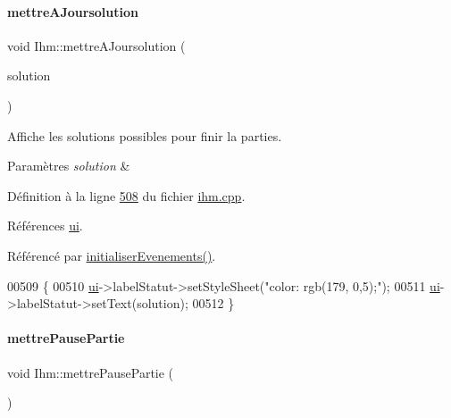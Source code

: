 \paragraph{\texorpdfstring{mettre\+A\+Joursolution}{mettreAJoursolution}}
{\footnotesize\ttfamily void Ihm\+::mettre\+A\+Joursolution (\begin{DoxyParamCaption}\item[{Q\+String}]{solution }\end{DoxyParamCaption})\hspace{0.3cm}{\ttfamily [slot]}}



Affiche les solutions possibles pour finir la parties. 


\begin{DoxyParams}{Paramètres}
{\em solution} & \\
\hline
\end{DoxyParams}


Définition à la ligne \hyperlink{ihm_8cpp_source_l00508}{508} du fichier \hyperlink{ihm_8cpp_source}{ihm.\+cpp}.



Références \hyperlink{ihm_8h_source_l00052}{ui}.



Référencé par \hyperlink{ihm_8cpp_source_l00075}{initialiser\+Evenements()}.


\begin{DoxyCode}
00509 \{
00510     \hyperlink{class_ihm_a0ac5f47856566ceeeca1720109bf70ea}{ui}->labelStatut->setStyleSheet(\textcolor{stringliteral}{"color: rgb(179, 0,5);"});
00511     \hyperlink{class_ihm_a0ac5f47856566ceeeca1720109bf70ea}{ui}->labelStatut->setText(solution);
00512 \}
\end{DoxyCode}
\mbox{\label{class_ihm_ab8456da276715f99ba373b71313592de}} 
\paragraph{\texorpdfstring{mettre\+Pause\+Partie}{mettrePausePartie}}
{\footnotesize\ttfamily void Ihm\+::mettre\+Pause\+Partie (\begin{DoxyParamCaption}{ }\end{DoxyParamCaption})\hspace{0.3cm}{\ttfamily [slot]}}




